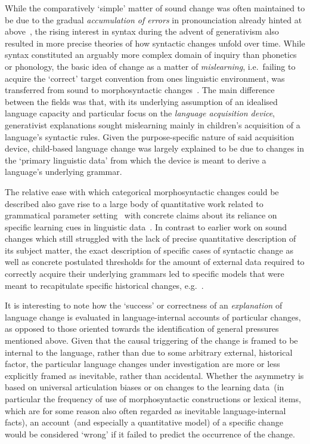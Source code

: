 While the comparatively `simple' matter of sound change was often maintained to be due to the gradual \emph{accumulation of errors} in pronounciation already hinted at above~\citep[see e.g.][for a textbook account of the general principle]{Hockett1958}, the rising interest in syntax during the advent of generativism also resulted in more precise theories of how syntactic changes unfold over time. While syntax constituted an arguably more complex domain of inquiry than phonetics or phonology, the basic idea of change as a matter of \emph{mislearning}, i.e.~failing to acquire the `correct' target convention from ones linguistic environment, was transferred from sound to morphosyntactic changes~\citep{Salmons2013}.
The main difference between the fields was that, with its underlying assumption of an idealised language capacity and particular focus on the \emph{language acquisition device}, generativist explanations sought mislearning mainly in children's acquisition of a language's syntactic rules. Given the purpose-specific nature of said acquisition device, child-based language change was largely explained to be due to changes in the `primary linguistic data' from which the device is meant to derive a language's underlying grammar.

The relative ease with which categorical morphosyntactic changes could be described also gave rise to a large body of quantitative work related to grammatical parameter setting~\citep{Lightfoot1991} with concrete claims about its reliance on specific learning cues in linguistic data~\citep{Gibson1994}.
In contrast to earlier work on sound changes which still struggled with the lack of precise quantitative description of its subject matter, the exact description of specific cases of syntactic change as well as concrete postulated thresholds for the amount of external data required to correctly acquire their underlying grammars led to specific models that were meant to recapitulate specific historical changes, e.g.~\citet{Yang2002}.

It is interesting to note how the `success' or correctness of an \emph{explanation} of language change is evaluated in language-internal accounts of particular changes, as opposed to those oriented towards the identification of general pressures mentioned above.
Given that the causal triggering of the change is framed to be internal to the language, rather than due to some arbitrary external, historical factor, the particular language changes under investigation are more or less explicitly framed as inevitable, rather than accidental.
Whether the asymmetry is based on universal articulation biases or on changes to the learning data~(in particular the frequency of use of morphosyntactic constructions or lexical items, which are for some reason also often regarded as inevitable language-internal facts), an account~(and especially a quantitative model) of a specific change would be considered `wrong' if it failed to predict the occurrence of the change.

